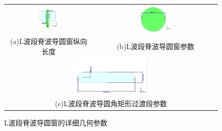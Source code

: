 \documentclass[master]{thesis-uestc}
\begin{document}
\begin{figure}[!htb]
    \small
    \centering
    \begin{tabular}{@{\ }c@{\ }c}
        \includegraphics[width=0.26\textwidth]{pic/chapter4/L波段窗纵向长度ORI.png} & 
        \hspace{5pt}
        \includegraphics[width=0.26\textwidth]{pic/chapter4/L波段圆形窗片.png}     \\
        \mbox{\small (a)L波段脊波导圆窗纵向长度}                                                                               & 
        \mbox{\small (b)L波段脊波导圆窗参数}                                                           \\[6bp]
        \multicolumn{2}{c}{\includegraphics[width=0.35\textwidth]{pic/chapter4/L波段圆角矩形过渡段ORI.png}} \\  %
        \multicolumn{2}{c}{\mbox{\small (c)L波段脊波导圆角矩形过渡段参数}}             
    \end{tabular}
    \caption{L波段脊波导圆窗的详细几何参数}
    \label{fig:L波段脊波导圆窗的详细几何参数}
\end{figure}
\end{document}
